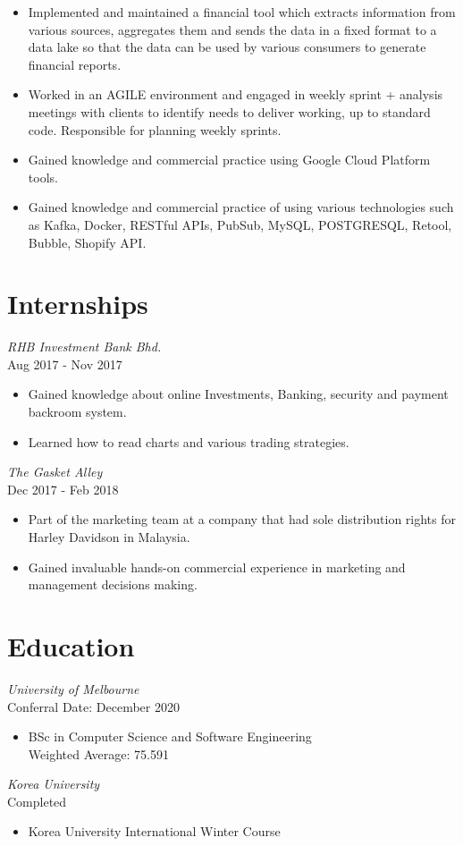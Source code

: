 \documentclass[10pt, a4paper]{cv}
\begin{document}
\begin{paracol}{2}
\begin{flushleft}
\begin{itemize}
			\item Implemented and maintained a financial tool which extracts information from various sources, aggregates them and sends the data in a fixed format to a data lake so that the data can be used by various consumers to generate financial reports.
			\item Worked in an AGILE environment and engaged in weekly sprint + analysis meetings with clients to identify needs to deliver working, up to standard code. Responsible for planning weekly sprints.
			\item Gained knowledge and commercial practice using Google Cloud Platform tools.
			\item Gained knowledge and commercial practice of using various technologies such as Kafka, Docker, RESTful APIs, PubSub, MySQL, POSTGRESQL, Retool, Bubble, Shopify API.
		\end{itemize}

		\section*{Internships}
		 {\sl RHB Investment Bank Bhd. } \\
		Aug 2017 - Nov 2017
		\begin{itemize} \itemsep -2pt
			\item Gained knowledge about online Investments, \quad Banking, security and payment backroom system.
			\item Learned how to read charts and various trading strategies.
		\end{itemize}
		{\sl The Gasket Alley } \\
		Dec 2017 - Feb 2018
		\begin{itemize} \itemsep -2pt
			\item Part of the marketing team at a company that had sole distribution rights for Harley Davidson in Malaysia.
			\item Gained invaluable hands-on commercial experience in marketing and management decisions making.
		\end{itemize}
		\vspace{24pt}

		\switchcolumn

		\section*{Education}
		 {\sl University of Melbourne} \\
		Conferral Date: December 2020
		\begin{itemize} \itemsep -1pt
			\item BSc in Computer Science and Software Engineering \\
			      Weighted Average: 75.591
		\end{itemize}
		{\sl Korea University} \\
		Completed
		\begin{itemize} \itemsep -1pt
			\item Korea University International Winter Course \\
		\end{itemize}


\end{flushleft}
\end{paracol}
\end{document}
